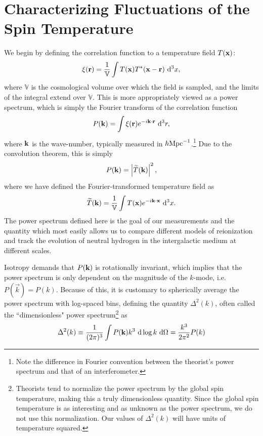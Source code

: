 \section{Characterizing Fluctuations of the Spin Temperature}
\label{sec:measuring}

We begin by defining the correlation function  to a temperature field $T(\mathbf{x})$:
\begin{equation}
  \xi(\mathbf{r}) = \frac{1}{\mathbb{V}} \int T(\mathbf{x})T^*(\mathbf{x}-\mathbf{r}) \ \mathrm{d}^3x, 
  \label{eq:correlation}
\end{equation}
where $\mathbb{V}$ is the cosmological volume over which the field is sampled, and the limits of the
integral extend over $\mathbb{V}$. This is more appropriately viewed as a power spectrum, which is
simply the Fourier transform of the correlation
function
\begin{equation}
  P(\mathbf{k}) = \int \xi(\mathbf{r})e^{-i\mathbf{k}\cdot\mathbf{r}}\ \mathrm{d}^3r, 
  \label{eq:def_pk}
\end{equation}
where $\mathbf{k}$ is the wave-number, typically measured in $h{\rm Mpc}^{-1}$.\footnote{Note the
  difference in Fourier convention between the theorist's power spectrum and that of an
interferometer.}
Due to the convolution theorem, this is simply
\begin{equation}
  P(\mathbf{k}) = \left|\widetilde{T}(\mathbf{k})\right|^2,
\end{equation}
where we have defined the Fourier-transformed temperature field as 
\begin{equation}
  \widetilde{T}(\mathbf{k}) = \frac{1}{\mathbb{V}}\int T(\mathbf{x})e^{-i\mathbf{k}\cdot\mathbf{x}}\ \mathrm{d}^3x.
  \label{eq:def_Tk}
\end{equation}
The power spectrum defined here is the goal of our measurements and the quantity which most easily
allows us to compare different models of reionization and track the evolution of neutral hydrogen in
the intergalactic medium at different scales.

Isotropy demands that $P(\mathbf{k})$ is rotationally invariant, which implies that the power spectrum is
only dependent on the magnitude of the $k$-mode, i.e. $P(\vec{k}) = P(k)$. Because of this, it is
customary to spherically average the power spectrum with log-spaced bins, defining the quantity
$\Delta^2(k)$, often called the
``dimensionless" power spectrum\footnote{Theorists tend to normalize the power spectrum by the
global spin temperature, making this a truly dimensionless quantity. Since the global spin 
temperature is as interesting and as unknown as the power spectrum, we do not use this
normalization. Our values of $\Delta^2(k)$ will have units of temperature squared.} as
\begin{equation}
  \Delta^2(k) \equiv \frac{1}{(2\pi)^3}\int P(\mathbf{k}) k^3\ \mathrm{d}\log{k}\ \mathrm{d}\Omega 
    = \frac{k^3}{2\pi^2}P(k)
    \label{eq:def_k3pk}
\end{equation}

